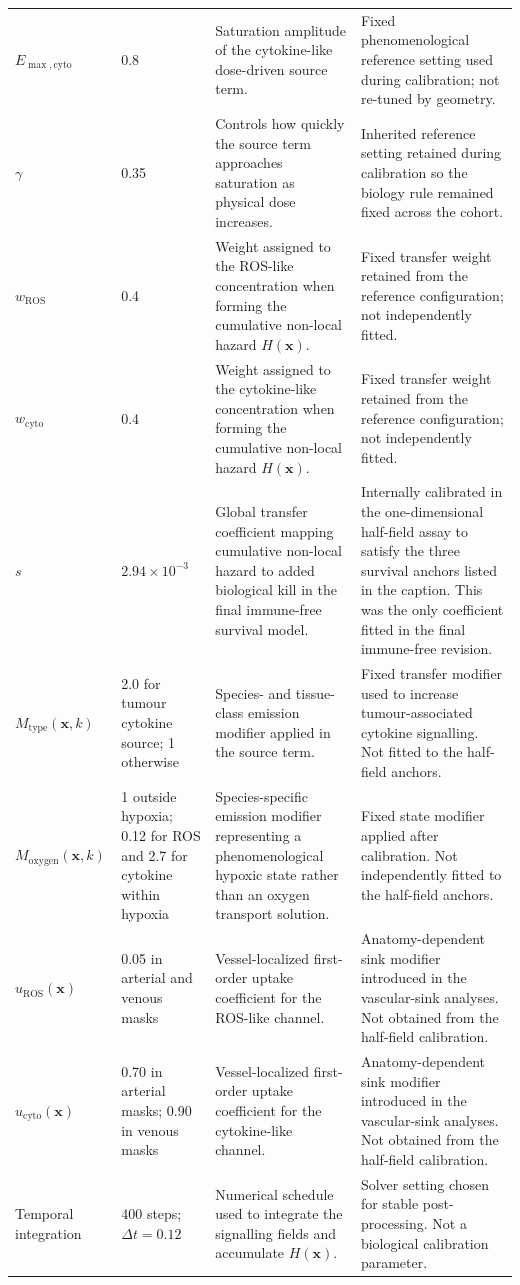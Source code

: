 \documentclass[10pt,a4paper]{article}
\begin{document}
\begin{table}[H]
\begin{tabularx}{\textwidth}{p{2.7cm}p{1.8cm}p{4.0cm}X}
$E_{\max,\mathrm{cyto}}$ & 0.8 & Saturation amplitude of the cytokine-like dose-driven source term. & Fixed phenomenological reference setting used during calibration; not re-tuned by geometry. \\
$\gamma$ & 0.35 & Controls how quickly the source term approaches saturation as physical dose increases. & Inherited reference setting retained during calibration so the biology rule remained fixed across the cohort. \\
$w_{\mathrm{ROS}}$ & 0.4 & Weight assigned to the ROS-like concentration when forming the cumulative non-local hazard $H(\mathbf{x})$. & Fixed transfer weight retained from the reference configuration; not independently fitted. \\
$w_{\mathrm{cyto}}$ & 0.4 & Weight assigned to the cytokine-like concentration when forming the cumulative non-local hazard $H(\mathbf{x})$. & Fixed transfer weight retained from the reference configuration; not independently fitted. \\
$s$ & $2.94\times10^{-3}$ & Global transfer coefficient mapping cumulative non-local hazard to added biological kill in the final immune-free survival model. & Internally calibrated in the one-dimensional half-field assay to satisfy the three survival anchors listed in the caption. This was the only coefficient fitted in the final immune-free revision. \\
$M_{\mathrm{type}}(\mathbf{x},k)$ & 2.0 for tumour cytokine source; 1 otherwise & Species- and tissue-class emission modifier applied in the source term. & Fixed transfer modifier used to increase tumour-associated cytokine signalling. Not fitted to the half-field anchors. \\
$M_{\mathrm{oxygen}}(\mathbf{x},k)$ & 1 outside hypoxia; 0.12 for ROS and 2.7 for cytokine within hypoxia & Species-specific emission modifier representing a phenomenological hypoxic state rather than an oxygen transport solution. & Fixed state modifier applied after calibration. Not independently fitted to the half-field anchors. \\
$u_{\mathrm{ROS}}(\mathbf{x})$ & 0.05 in arterial and venous masks & Vessel-localized first-order uptake coefficient for the ROS-like channel. & Anatomy-dependent sink modifier introduced in the vascular-sink analyses. Not obtained from the half-field calibration. \\
$u_{\mathrm{cyto}}(\mathbf{x})$ & 0.70 in arterial masks; 0.90 in venous masks & Vessel-localized first-order uptake coefficient for the cytokine-like channel. & Anatomy-dependent sink modifier introduced in the vascular-sink analyses. Not obtained from the half-field calibration. \\
Temporal integration & 400 steps; $\Delta t=0.12$ & Numerical schedule used to integrate the signalling fields and accumulate $H(\mathbf{x})$. & Solver setting chosen for stable post-processing. Not a biological calibration parameter. \\
\bottomrule
\end{tabularx}
\end{table}
\end{document}
